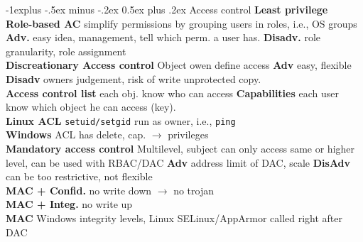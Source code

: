 \documentclass[10pt,landscape]{article}
\makeatletter
\renewcommand{\subsection}{\@startsection{subsection}{2}{0mm}%
                                {-1explus -.5ex minus -.2ex}%
                                {0.5ex plus .2ex}%
                                {\normalfont\normalsize\bfseries}}
\makeatother
\begin{document}
\begin{multicols*}{4}
\subsection{Access control}
\textbf{Least privilege}\\
\textbf{Role-based AC} simplify permissions by grouping users in roles, i.e., OS groups
\textbf{Adv.} easy idea, management, tell which perm. a user has.
\textbf{Disadv.} role granularity, role assignment\\
\textbf{Discreationary Access control} Object owen define access 
\textbf{Adv} easy, flexible \textbf{Disadv} owners judgement, risk of write unprotected copy.\\
\textbf{Access control list} each obj. know who can access
\textbf{Capabilities} each user know which object he can access (key).\\
\textbf{Linux ACL} \texttt{setuid/setgid} run as owner, i.e., \texttt{ping}\\
\textbf{Windows} ACL has delete, cap. $\rightarrow$ privileges\\
\textbf{Mandatory access control} Multilevel, subject can only access same or higher level, can be used with RBAC/DAC 
\textbf{Adv} address limit of DAC, scale
\textbf{DisAdv} can be too restrictive, not flexible\\
\textbf{MAC + Confid.} no write down $\rightarrow$ no trojan\\
\textbf{MAC + Integ.} no write up\\
\textbf{MAC} Windows integrity levels, Linux SELinux/AppArmor called right after DAC

\end{multicols*}
\end{document}
